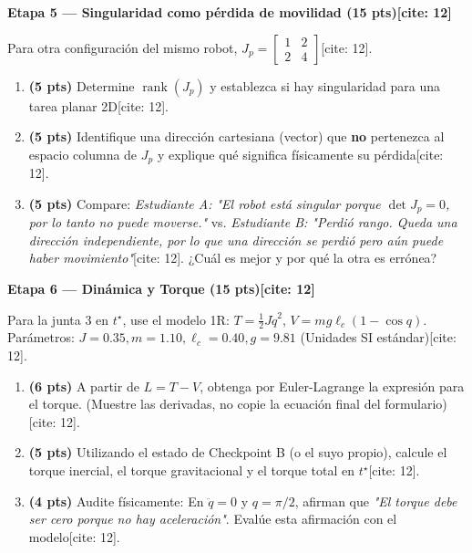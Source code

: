 \documentclass[11pt, a4paper]{article}
\begin{document}
\noindent\textbf{\large Etapa 5 — Singularidad como pérdida de movilidad (15 pts)[cite: 12]}

Para otra configuración del mismo robot, $J_p = \begin{bmatrix} 1 & 2 \\ 2 & 4 \end{bmatrix}$[cite: 12].

\begin{enumerate}[label=\textbf{5.\arabic*.}]
    \item \textbf{(5 pts)} Determine $\operatorname{rank}(J_p)$ y establezca si hay singularidad para una tarea planar 2D[cite: 12].
    \item \textbf{(5 pts)} Identifique una dirección cartesiana (vector) que \textbf{no} pertenezca al espacio columna de $J_p$ y explique qué significa físicamente su pérdida[cite: 12].
    \item \textbf{(5 pts)} Compare: \textit{Estudiante A: "El robot está singular porque $\det J_p=0$, por lo tanto no puede moverse."} vs. \textit{Estudiante B: "Perdió rango. Queda una dirección independiente, por lo que una dirección se perdió pero aún puede haber movimiento"}[cite: 12]. ¿Cuál es mejor y por qué la otra es errónea? \vspace{3cm}
\end{enumerate}

\newpage
\noindent\textbf{\large Etapa 6 — Dinámica y Torque (15 pts)[cite: 12]}

Para la junta 3 en $t^\star$, use el modelo 1R: $T = \frac{1}{2}J\dot{q}^2$, $V = mg\ell_c(1 - \cos q)$. \\
Parámetros: $J = 0.35, m = 1.10, \ell_c = 0.40, g = 9.81$ (Unidades SI estándar)[cite: 12].

\begin{enumerate}[label=\textbf{6.\arabic*.}]
    \item \textbf{(6 pts)} A partir de $L = T - V$, obtenga por Euler-Lagrange la expresión para el torque. (Muestre las derivadas, no copie la ecuación final del formulario)[cite: 12].
    \item \textbf{(5 pts)} Utilizando el estado de Checkpoint B (o el suyo propio), calcule el torque inercial, el torque gravitacional y el torque total en $t^\star$[cite: 12].
    \item \textbf{(4 pts)} Audite físicamente: En $\ddot{q}=0$ y $q=\pi/2$, afirman que \textit{"El torque debe ser cero porque no hay aceleración"}. Evalúe esta afirmación con el modelo[cite: 12].
\end{enumerate}
\end{document}
